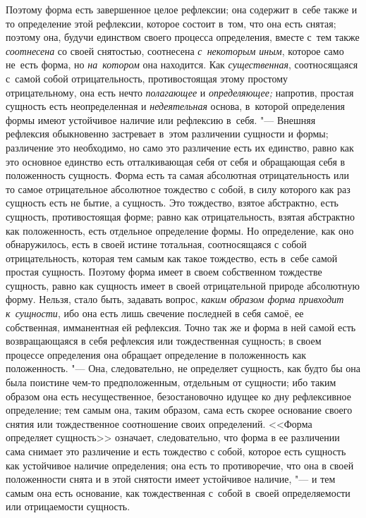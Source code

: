 Поэтому форма есть завершенное целое рефлексии; она содержит в~себе также и то
определение этой рефлексии, которое состоит в~том, что она есть снятая; поэтому
она, будучи единством своего процесса определения, вместе с~тем также
{\em соотнесена} со своей снятостью, соотнесена {\em с~некоторым иным},
которое само не~есть форма, но {\em на~котором} она находится. Как
{\em существенная}, соотносящаяся с~самой собой отрицательность, противостоящая
этому простому отрицательному, она есть нечто {\em полагающее} и
{\em определяющее;} напротив, простая сущность есть неопределенная и
{\em недеятельная} основа, в~которой определения формы имеют устойчивое наличие
или рефлексию в~себя. "--- Внешняя рефлексия обыкновенно застревает в~этом
различении сущности и формы; различение это необходимо, но само это различение
есть их единство, равно как это основное единство есть отталкивающая себя от
себя и обращающая себя в положенность сущность. Форма есть та самая абсолютная
отрицательность или то самое отрицательное абсолютное тождество с собой, в силу
которого как раз сущность есть не бытие, а сущность. Это тождество, взятое
абстрактно, есть сущность, противостоящая форме; равно как отрицательность,
взятая абстрактно как положенность, есть отдельное определение формы. Но
определение, как оно обнаружилось, есть в своей истине тотальная, соотносящаяся
с собой отрицательность, которая тем самым как такое тождество, есть в~себе
самой простая сущность. Поэтому форма имеет в своем собственном тождестве
сущность, равно как сущность имеет в своей отрицательной природе абсолютную
форму. Нельзя, стало быть, задавать вопрос,
{\em каким образом форма привходит к~сущности}, ибо она есть лишь свечение
последней в себя самоё, ее собственная, имманентная ей рефлексия. Точно так же
и форма в ней самой есть возвращающаяся в себя рефлексия или тождественная
сущность; в своем процессе определения она обращает определение в положенность
как положенность. "--- Она, следовательно, не определяет сущность, как будто бы
она была поистине чем-то предположенным, отдельным от сущности; ибо таким
образом она есть несущественное, безостановочно идущее ко дну рефлексивное
определение; тем самым она, таким образом, сама есть скорее основание своего
снятия или тождественное соотношение своих определений. <<Форма определяет
сущность>> означает, следовательно, что форма в ее различении сама снимает это
различение и есть тождество с собой, которое есть сущность как устойчивое
наличие определения; она есть то противоречие, что она в своей положенности
снята и в этой снятости имеет устойчивое наличие, "--- и тем самым она есть
основание, как тождественная с~собой в~своей определяемости или отрицаемости
сущность.

